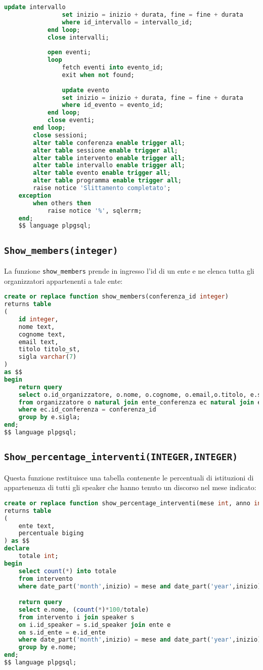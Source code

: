 \begin{lstlisting}[language=SQL,style=mystyle]
				update intervallo
				set inizio = inizio + durata, fine = fine + durata
				where id_intervallo = intervallo_id;
			end loop;
			close intervalli;
			
			open eventi;
			loop
				fetch eventi into evento_id;
				exit when not found;
	
				update evento
				set inizio = inizio + durata, fine = fine + durata
				where id_evento = evento_id;
			end loop;
			close eventi;
		end loop;
		close sessioni;
        alter table conferenza enable trigger all;
        alter table sessione enable trigger all;
        alter table intervento enable trigger all;
        alter table intervallo enable trigger all;
        alter table evento enable trigger all;
        alter table programma enable trigger all;
        raise notice 'Slittamento completato';
	exception
		when others then
			raise notice '%', sqlerrm;
	end;
	$$ language plpgsql;
\end{lstlisting}

\subsection{\texttt{Show\_members(integer)}}
La funzione \texttt{show\_members} prende in ingresso l'id di un ente e ne elenca tutta gli organizzatori appartenenti a tale ente:
\begin{lstlisting}[language=SQL,style=mystyle]
create or replace function show_members(conferenza_id integer)
returns table 
(
    id integer, 
    nome text, 
    cognome text, 
    email text,
    titolo titolo_st, 
    sigla varchar(7)
) 
as $$
begin
    return query
    select o.id_organizzatore, o.nome, o.cognome, o.email,o.titolo, e.sigla
    from organizzatore o natural join ente_conferenza ec natural join ente e  
    where ec.id_conferenza = conferenza_id
    group by e.sigla;
end;
$$ language plpgsql;
\end{lstlisting}
\subsection{\texttt{Show\_percentage\_interventi(INTEGER,INTEGER)}}
Questa funzione restituisce una tabella contenente le percentuali di istituzioni di appartenenza di tutti gli speaker che hanno tenuto un discorso nel mese indicato:
\begin{lstlisting}[language=SQL,style=mystyle]
create or replace function show_percentage_interventi(mese int, anno int)
returns table
(
    ente text,
    percentuale biging
) as $$
declare
    totale int;
begin
    select count(*) into totale
    from intervento
    where date_part('month',inizio) = mese and date_part('year',inizio) = anno;

    return query
    select e.nome, (count(*)*100/totale)
    from intervento i join speaker s 
    on i.id_speaker = s.id_speaker join ente e 
    on s.id_ente = e.id_ente
    where date_part('month',inizio) = mese and date_part('year',inizio) = anno
    group by e.nome;
end;
$$ language plpgsql;
\end{lstlisting}
